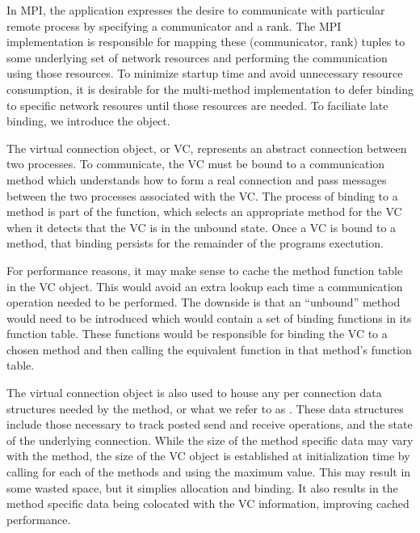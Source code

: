In MPI, the application expresses the desire to communicate with particular
remote process by specifying a communicator and a rank.  The MPI implementation
is responsible for mapping these (communicator, rank) tuples to some underlying
set of network resources and performing the communication using those
resources.  To minimize startup time and avoid unnecessary resource
consumption, it is desirable for the multi-method implementation to defer
binding to specific network resoures until those resources are needed.  To
faciliate late binding, we introduce the  object.

The virtual connection object, or VC, represents an abstract connection between
two processes.  To communicate, the VC must be bound to a communication method
which understands how to form a real connection and pass messages between the
two processes associated with the VC.  The process of binding to a method is
part of the  function, which selects an
appropriate method for the VC when it detects that the VC is in the unbound
state.  Once a VC is bound to a method, that binding persists for the remainder
of the programs exectution.

\begin{implnote}
  For performance reasons, it may make sense to cache the method function table
  in the VC object.  This would avoid an extra lookup each time a communication
  operation needed to be performed.  The downside is that an ``unbound'' method
  would need to be introduced which would contain a set of binding functions in
  its function table.  These functions would be responsible for binding the VC
  to a chosen method and then calling the equivalent function in that method's
  function table.
\end{implnote}

The virtual connection object is also used to house any per connection data
structures needed by the method, or what we refer to as .  These data structures include those necessary to track posted send
and receive operations, and the state of the underlying connection.  While the
size of the method specific data may vary with the method, the size of the VC
object is established at initialization time by calling
 for each of the methods and using the maximum
value.  This may result in some wasted space, but it simplies allocation and
binding.  It also results in the method specific data being colocated with the
VC information, improving cached performance.

